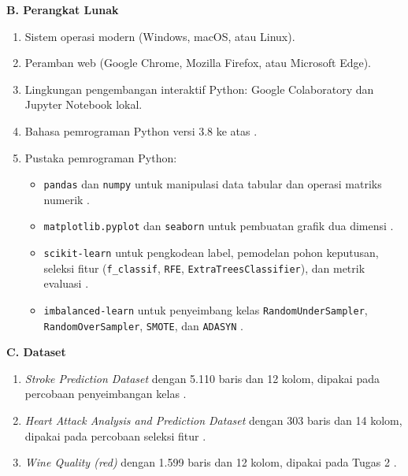 \documentclass[a4paper,oneside,12pt]{report}
\begin{document}
\vspace{0.1cm}
\noindent\textbf{B. Perangkat Lunak}
\begin{enumerate}[noitemsep, topsep=1pt, parsep=0pt]
    \item Sistem operasi modern (Windows, macOS, atau Linux).
    \item Peramban web (Google Chrome, Mozilla Firefox, atau Microsoft Edge).
    \item Lingkungan pengembangan interaktif Python: Google Colaboratory dan Jupyter Notebook lokal.
    \item Bahasa pemrograman Python versi 3.8 ke atas \cite{python-docs}.
    \item Pustaka pemrograman Python:
    \begin{itemize}[noitemsep, topsep=1pt, parsep=0.5pt]
        \item \texttt{pandas} dan \texttt{numpy} untuk manipulasi data tabular dan operasi matriks numerik \cite{pandas-docs,numpy-docs}.
        \item \texttt{matplotlib.pyplot} dan \texttt{seaborn} untuk pembuatan grafik dua dimensi \cite{matplotlib-docs,seaborn-docs}.
        \item \texttt{scikit-learn} untuk pengkodean label, pemodelan pohon keputusan, seleksi fitur (\texttt{f\_classif}, \texttt{RFE}, \texttt{ExtraTreesClassifier}), dan metrik evaluasi \cite{sklearn-docs,pedregosa2011}.
        \item \texttt{imbalanced-learn} untuk penyeimbang kelas \texttt{RandomUnderSampler}, \texttt{RandomOverSampler}, \texttt{SMOTE}, dan \texttt{ADASYN} \cite{imblearn-docs,lemaitre2017}.
    \end{itemize}
\end{enumerate}

\vspace{0.1cm}
\noindent\textbf{C. Dataset}
\begin{enumerate}[noitemsep, topsep=1pt, parsep=0pt]
    \item \textit{Stroke Prediction Dataset} dengan 5.110 baris dan 12 kolom, dipakai pada percobaan penyeimbangan kelas \cite{kaggle-stroke}.
    \item \textit{Heart Attack Analysis and Prediction Dataset} dengan 303 baris dan 14 kolom, dipakai pada percobaan seleksi fitur \cite{kaggle-heart}.
    \item \textit{Wine Quality (red)} dengan 1.599 baris dan 12 kolom, dipakai pada Tugas 2 \cite{uci-wine,cortez2009}.
\end{enumerate}
\end{document}
